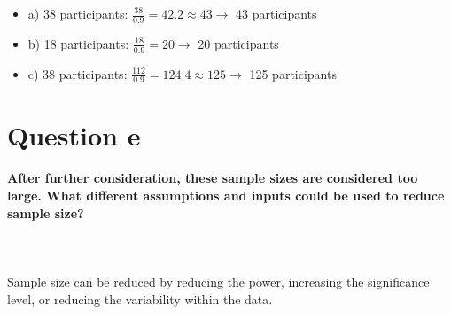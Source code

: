 \documentclass{article}
\begin{document}
\begin{itemize}
    \item a) 38 participants: $\frac{38}{0.9} = 42.2 \approx 43 \rightarrow$ 43 participants
    \item b) 18 participants: $\frac{18}{0.9} = 20 \rightarrow$ 20 participants
    \item c) 38 participants: $\frac{112}{0.9} = 124.4 \approx 125 \rightarrow$ 125 participants  
\end{itemize}


\section*{Question e}
\paragraph{After further consideration, these sample sizes are considered too large. What different assumptions and inputs
could be used to reduce sample size?}\mbox{}\\
\\
Sample size can be reduced by reducing the power, increasing the significance level, or reducing the variability within the data.
\end{document}
